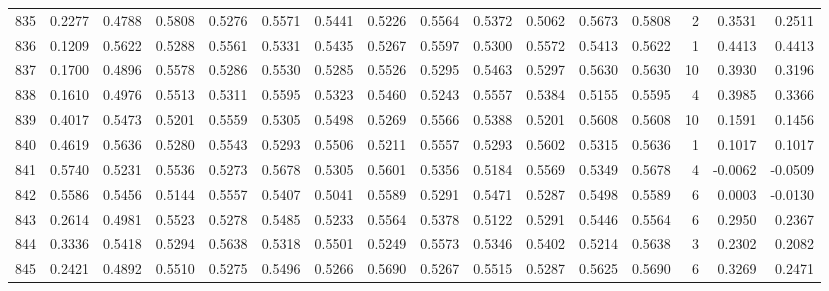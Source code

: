 \begin{tabular}{lrrrrrrrrrrrrrrr}
835 &      0.2277 &  0.4788 &  0.5808 &  0.5276 &  0.5571 &  0.5441 &  0.5226 &  0.5564 &  0.5372 &  0.5062 &   0.5673 &     0.5808 &      2 &                    0.3531 &                     0.2511 \\
836 &      0.1209 &  0.5622 &  0.5288 &  0.5561 &  0.5331 &  0.5435 &  0.5267 &  0.5597 &  0.5300 &  0.5572 &   0.5413 &     0.5622 &      1 &                    0.4413 &                     0.4413 \\
837 &      0.1700 &  0.4896 &  0.5578 &  0.5286 &  0.5530 &  0.5285 &  0.5526 &  0.5295 &  0.5463 &  0.5297 &   0.5630 &     0.5630 &     10 &                    0.3930 &                     0.3196 \\
838 &      0.1610 &  0.4976 &  0.5513 &  0.5311 &  0.5595 &  0.5323 &  0.5460 &  0.5243 &  0.5557 &  0.5384 &   0.5155 &     0.5595 &      4 &                    0.3985 &                     0.3366 \\
839 &      0.4017 &  0.5473 &  0.5201 &  0.5559 &  0.5305 &  0.5498 &  0.5269 &  0.5566 &  0.5388 &  0.5201 &   0.5608 &     0.5608 &     10 &                    0.1591 &                     0.1456 \\
840 &      0.4619 &  0.5636 &  0.5280 &  0.5543 &  0.5293 &  0.5506 &  0.5211 &  0.5557 &  0.5293 &  0.5602 &   0.5315 &     0.5636 &      1 &                    0.1017 &                     0.1017 \\
841 &      0.5740 &  0.5231 &  0.5536 &  0.5273 &  0.5678 &  0.5305 &  0.5601 &  0.5356 &  0.5184 &  0.5569 &   0.5349 &     0.5678 &      4 &                   -0.0062 &                    -0.0509 \\
842 &      0.5586 &  0.5456 &  0.5144 &  0.5557 &  0.5407 &  0.5041 &  0.5589 &  0.5291 &  0.5471 &  0.5287 &   0.5498 &     0.5589 &      6 &                    0.0003 &                    -0.0130 \\
843 &      0.2614 &  0.4981 &  0.5523 &  0.5278 &  0.5485 &  0.5233 &  0.5564 &  0.5378 &  0.5122 &  0.5291 &   0.5446 &     0.5564 &      6 &                    0.2950 &                     0.2367 \\
844 &      0.3336 &  0.5418 &  0.5294 &  0.5638 &  0.5318 &  0.5501 &  0.5249 &  0.5573 &  0.5346 &  0.5402 &   0.5214 &     0.5638 &      3 &                    0.2302 &                     0.2082 \\
845 &      0.2421 &  0.4892 &  0.5510 &  0.5275 &  0.5496 &  0.5266 &  0.5690 &  0.5267 &  0.5515 &  0.5287 &   0.5625 &     0.5690 &      6 &                    0.3269 &                     0.2471 \\

\end{tabular}
